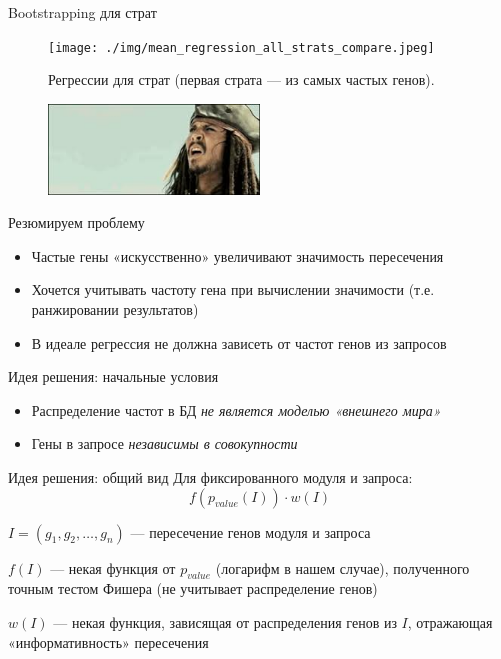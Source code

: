 \documentclass[10pt,pdf,utf8,russian,aspectratio=169]{beamer}
\begin{document}
\begin{frame}{Bootstrapping для страт}
    \begin{figure}[ht]
        \centering
        \caption{Регрессии для страт (первая страта --- из самых частых генов).}
        \texttt{[image: ./img/mean\_regression\_all\_strats\_compare.jpeg]}
    \end{figure}
\end{frame}

\begin{frame}
    \begin{figure}[p]
        \centering
        \includegraphics[width=0.5\textwidth]{./img/wut.jpeg}
    \end{figure}
\end{frame}

\begin{frame}{Резюмируем проблему}
    \begin{itemize}[<+->]
	    \item Частые гены «искусственно» увеличивают значимость пересечения
	    \item Хочется учитывать частоту гена при вычислении значимости (т.е. ранжировании результатов)
	    \item В идеале регрессия не должна зависеть от частот генов из запросов
	 \end{itemize}
\end{frame}

\begin{frame}{Идея решения: начальные условия}
    \begin{itemize}[<+->]
	    \item Распределение частот в БД \emph{не является моделью «внешнего мира»}
	    \item Гены в запросе \emph{независимы в совокупности}
	 \end{itemize}
\end{frame}

\begin{frame}{Идея решения: общий вид}
    Для фиксированного модуля и запроса:
    \begin{equation}
        f(p_{value}(I)) \cdot w(I)
    \end{equation}
    \begin{description}
        \item $I = (g_1, g_2, \dots, g_n)$ --- пересечение генов модуля и запроса
        \item $f(I)$ --- некая функция от $p_{value}$ (логарифм в нашем случае), полученного точным тестом Фишера (не учитывает распределение генов)
        \item $w(I)$ --- некая функция, зависящая от распределения генов из $I$, отражающая \alert<2>{«информативность»} пересечения
    \end{description}
\end{frame}
\end{document}
